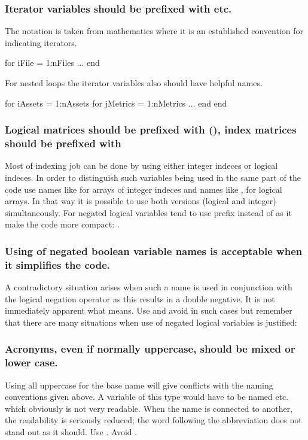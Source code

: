 \documentclass[titlepage,a4paper,12pt]{article}
\begin{document}
\subsubsection{Iterator variables should be prefixed with  etc.} The notation is taken from mathematics where it is an
established convention for indicating iterators.
\begin{verbmcode}
for iFile = 1:nFiles
    ...
end
\end{verbmcode}
For nested loops the iterator variables also should have helpful
names.
\begin{verbmcode}
for iAssets = 1:nAssets
    for jMetrics = 1:nMetrics
        ...
    end
end
\end{verbmcode}

\subsubsection{Logical matrices should be prefixed with (),%
  index matrices should be prefixed with }
Most of indexing job can be done by using either integer indeces or
logical indeces. In order to distinguish such variables being used
in the same part of the code use names like
 for arrays
of integer indeces and names like
, for
logical arrays. In that way it is possible to use both versions
(logical and integer) simultaneously. For negated logical variables
tend to use prefix  instead of  as
it make the code more compact: .

\subsubsection{Using of negated boolean variable names is acceptable
when it simplifies the code.} A contradictory situation arises when
such a name is used in conjunction with the logical negation
operator as this results in a double negative. It is not immediately
apparent what  means. Use 
and avoid  in such cases but remember that there
are many situations when use of negated logical variables is
justified: 

\subsubsection{Acronyms, even if normally uppercase, should be mixed
or lower case.}
 Using all uppercase for the base name will give
conflicts with the naming conventions given above. A variable of
this type would have to be named  etc. which
obviously is not very readable. When the name is connected to
another, the readability is seriously reduced; the word following
the abbreviation does not stand out as it should. Use
. Avoid .
\end{document}
